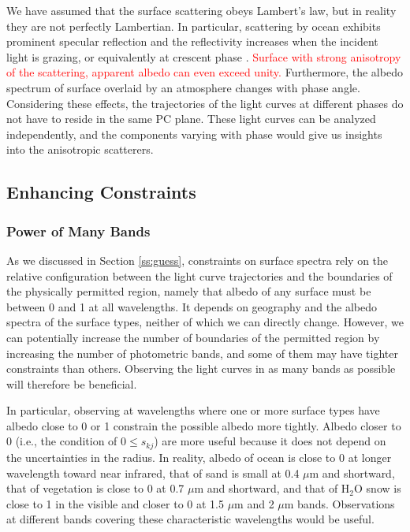 \documentclass[iop,numberedappendix,apj]{emulateapj}
\def\edit#1{\textcolor{red}{#1}}
\def\memoYF#1{\color{red}[YF: {\bf #1}]\color{black}}
\begin{document}
We have assumed that the surface scattering obeys Lambert's law, but in reality they are not perfectly Lambertian. 
In particular, scattering by ocean exhibits prominent specular reflection and the reflectivity increases when the incident light is grazing, or equivalently at crescent phase \citep[e.g.,][]{Williams2008,Robinson2010,Robinson2014}. 
\edit{Surface with strong anisotropy of the scattering, apparent albedo can even exceed unity. }
Furthermore, the albedo spectrum of surface overlaid by an atmosphere changes with phase angle.  
Considering these effects, the trajectories of the light curves at different phases do not have to reside in the same PC plane. 
These light curves can be analyzed independently, and the components varying with phase would give us insights into the anisotropic scatterers. 




\subsection{Enhancing Constraints}
\label{ss:enhancing_constraints}


\subsubsection{Power of Many Bands}


As we discussed in Section \ref{ss:guess}, constraints on surface spectra rely on the relative configuration between the light curve trajectories and the boundaries of the physically permitted region, namely that albedo of any surface must be between 0 and 1 at all wavelengths. 
It depends on geography and the albedo spectra of the surface types, neither of which we can directly change. 
However, we can potentially increase the number of boundaries of the permitted region by increasing the number of photometric bands, and some of them may have tighter constraints than others. 
Observing the light curves in as many bands as possible will therefore be beneficial. 

In particular, observing at wavelengths where one or more surface types have albedo close to 0 or 1 constrain the possible albedo more tightly. 
Albedo closer to 0 (i.e., the condition of $0 \le s_{kj}$) are more useful because it does not depend on the uncertainties in the radius. 
In reality, albedo of ocean is close to 0 at longer wavelength toward near infrared, that of sand is small at 0.4 $\mu $m and shortward, that of vegetation is close to 0 at 0.7 $\mu$m and shortward, and that of H$_2$O snow is close to 1 in the visible and closer to 0 at 1.5 $\mu$m and 2 $\mu$m bands. 
Observations at different bands covering these characteristic wavelengths would be useful. 
\end{document}
